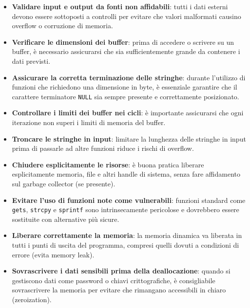 \begin{itemize}
  \item \textbf{Validare input e output da fonti non affidabili}: tutti i dati esterni
    devono essere sottoposti a controlli per evitare che valori malformati causino
    overflow o corruzione di memoria.

  \item \textbf{Verificare le dimensioni dei buffer}: prima di accedere o scrivere
    su un buffer, è necessario assicurarsi che sia sufficientemente grande da
    contenere i dati previsti.

  \item \textbf{Assicurare la corretta terminazione delle stringhe}: durante l'utilizzo
    di funzioni che richiedono una dimensione in byte, è essenziale garantire
    che il carattere terminatore \texttt{NULL} sia sempre presente e correttamente
    posizionato.

  \item \textbf{Controllare i limiti dei buffer nei cicli}: è importante assicurarsi
    che ogni iterazione non superi i limiti di memoria del buffer.

  \item \textbf{Troncare le stringhe in input}: limitare la lunghezza delle stringhe
    in input prima di passarle ad altre funzioni riduce i rischi di overflow.

  \item \textbf{Chiudere esplicitamente le risorse}: è buona pratica liberare esplicitamente
    memoria, file e altri handle di sistema, senza fare affidamento sul garbage collector
    (se presente).

  \item \textbf{Evitare l'uso di funzioni note come vulnerabili}: funzioni standard
    come \texttt{gets}, \texttt{strcpy} e \texttt{sprintf} sono intrinsecamente pericolose
    e dovrebbero essere sostituite con alternative più sicure.

  \item \textbf{Liberare correttamente la memoria}: la memoria dinamica va liberata
    in tutti i punti di uscita del programma, compresi quelli dovuti a
    condizioni di errore (evita memory leak).

  \item \textbf{Sovrascrivere i dati sensibili prima della deallocazione}: quando
    si gestiscono dati come password o chiavi crittografiche, è consigliabile
    sovrascrivere la memoria per evitare che rimangano accessibili in chiaro (zeroization).
\end{itemize}

